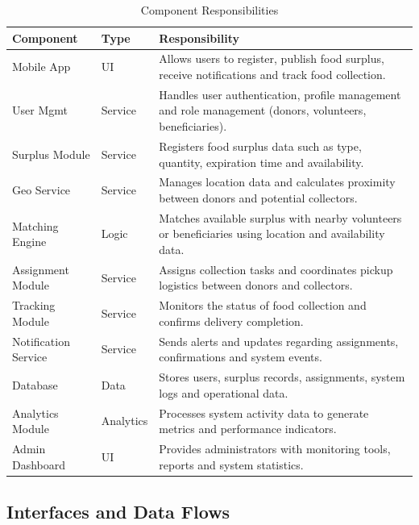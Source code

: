 \documentclass[conference]{IEEEtran}
\begin{document}
\begin{table}[H]
\centering
\caption{Component Responsibilities}
\label{tab:components}
\begin{tabular}{@{}p{2.0cm}p{1.5cm}p{4.5cm}@{}}
\toprule
\textbf{Component} & \textbf{Type} & \textbf{Responsibility} \\
\midrule
Mobile App & UI & Allows users to register, publish food surplus, receive notifications and track food collection. \\
User Mgmt & Service & Handles user authentication, profile management and role management (donors, volunteers, beneficiaries). \\
Surplus Module & Service & Registers food surplus data such as type, quantity, expiration time and availability. \\
Geo Service & Service & Manages location data and calculates proximity between donors and potential collectors. \\
Matching Engine & Logic & Matches available surplus with nearby volunteers or beneficiaries using location and availability data. \\
Assignment Module & Service & Assigns collection tasks and coordinates pickup logistics between donors and collectors. \\
Tracking Module & Service & Monitors the status of food collection and confirms delivery completion. \\
Notification Service & Service & Sends alerts and updates regarding assignments, confirmations and system events. \\
Database & Data & Stores users, surplus records, assignments, system logs and operational data. \\
Analytics Module & Analytics & Processes system activity data to generate metrics and performance indicators. \\
Admin Dashboard & UI & Provides administrators with monitoring tools, reports and system statistics. \\
\bottomrule
\end{tabular}
\end{table}

\subsection{Interfaces and Data Flows}
\end{document}
